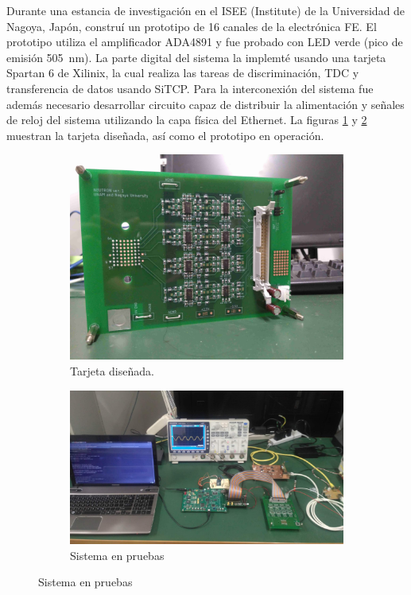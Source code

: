 Durante una estancia de investigación en el ISEE (Institute) de la Universidad de Nagoya, Japón, construí un prototipo de \num{16} canales de la electrónica FE. El prototipo utiliza el amplificador ADA4891 y fue probado con LED verde (pico de emisión \SI{505}{\nano\metre}). La parte digital del sistema la implemté usando una tarjeta Spartan \num{6} de Xilinix, la cual realiza las tareas de discriminación, TDC y transferencia de datos usando SiTCP. Para la interconexión del sistema fue además necesario desarrollar circuito capaz de distribuir la alimentación y señales de reloj del sistema utilizando la capa física del Ethernet. La figuras \ref{fig:neutron-pcb} y \ref{fig:complete-sys} muestran la tarjeta diseñada, así como el prototipo en operación.

\begin{figure}
  \centering
  \begin{subfigure}[b]{0.49\textwidth}
	\includegraphics[width=\textwidth]{neutron_ver1.jpg}
	\caption{Tarjeta diseñada.}
	\label{fig:neutron-pcb}
  \end{subfigure}
  \begin{subfigure}[b]{0.49\textwidth}
	\includegraphics[width=\textwidth]{complete-system.jpg}
	\caption{Sistema en pruebas}
	\label{fig:complete-sys}
  \end{subfigure}
  \label{fig:new-electronics}
\end{figure}

